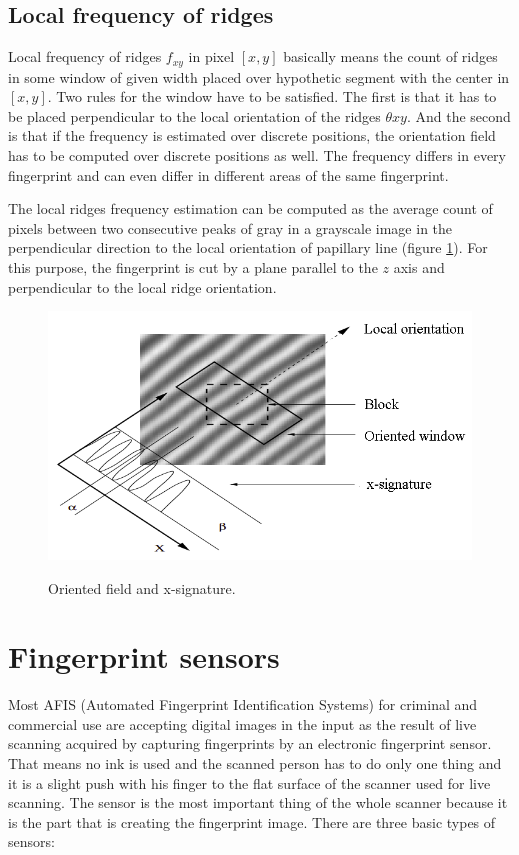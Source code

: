 \subsection{Local frequency of ridges}
Local frequency of ridges $f_{xy}$ in pixel $[x,y]$ basically means the count of ridges in some window of given width placed over hypothetic segment with the center in $[x,y]$. Two rules for the window have to be satisfied. The first is that it has to be placed perpendicular to the local orientation of the ridges $\theta{xy}$. And the second is that if the frequency is estimated over discrete positions, the orientation field has to be computed over discrete positions as well. The frequency differs in every fingerprint and can even differ in different areas of the same fingerprint.\cite{maltoni2009handbook}

The local ridges frequency estimation can be computed as the average count of pixels between two consecutive peaks of gray in a grayscale image in the perpendicular direction to the local orientation of papillary line (figure \ref{fig:freq}). For this purpose, the fingerprint is cut by a plane parallel to the $z$ axis and perpendicular to the local ridge orientation.\cite{hong1998fingerprint}

\begin{figure}[H]
    \centering
        {\includegraphics[width=0.7\linewidth]{obrazky-figures/freq.png}}\\
        \caption{Oriented field and x-signature. \cite{hong1998fingerprint}}
        \label{fig:freq}
\end{figure}

\label{sensors}
\section{Fingerprint sensors}
Most AFIS (Automated Fingerprint Identification Systems) for criminal and commercial use are accepting digital images in the input as the result of live scanning acquired by capturing fingerprints by an electronic fingerprint sensor. That means no ink is used and the scanned person has to do only one thing and it is a slight push with his finger to the flat surface of the scanner used for live scanning. The sensor is the most important thing of the whole scanner because it is the part that is creating the fingerprint image. There are three basic types of sensors:\cite{jain2007handbook}   


